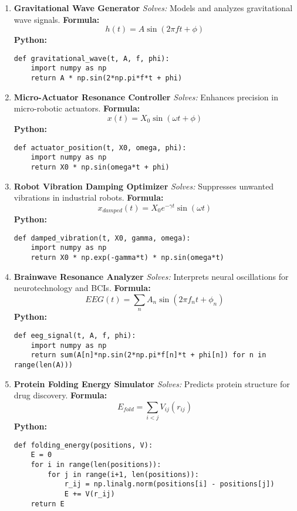 \documentclass[12pt]{article}
\begin{document}
\begin{enumerate}[leftmargin=0pt, label=\textbf{\arabic*.}, itemsep=3em]
\item \textbf{Gravitational Wave Generator}  
\textit{Solves:} Models and analyzes gravitational wave signals.  
\textbf{Formula:}  
\[
h(t) = A \sin(2\pi f t + \phi)
\]  
\textbf{Python:}
\begin{lstlisting}
def gravitational_wave(t, A, f, phi):
    import numpy as np
    return A * np.sin(2*np.pi*f*t + phi)
\end{lstlisting}

\item \textbf{Micro-Actuator Resonance Controller}  
\textit{Solves:} Enhances precision in micro-robotic actuators.  
\textbf{Formula:}  
\[
x(t) = X_0 \sin(\omega t + \phi)
\]  
\textbf{Python:}
\begin{lstlisting}
def actuator_position(t, X0, omega, phi):
    import numpy as np
    return X0 * np.sin(omega*t + phi)
\end{lstlisting}

\item \textbf{Robot Vibration Damping Optimizer}  
\textit{Solves:} Suppresses unwanted vibrations in industrial robots.  
\textbf{Formula:}  
\[
x_{damped}(t) = X_0 e^{-\gamma t} \sin(\omega t)
\]  
\textbf{Python:}
\begin{lstlisting}
def damped_vibration(t, X0, gamma, omega):
    import numpy as np
    return X0 * np.exp(-gamma*t) * np.sin(omega*t)
\end{lstlisting}

\item \textbf{Brainwave Resonance Analyzer}  
\textit{Solves:} Interprets neural oscillations for neurotechnology and BCIs.  
\textbf{Formula:}  
\[
EEG(t) = \sum_{n} A_n \sin(2\pi f_n t + \phi_n)
\]  
\textbf{Python:}
\begin{lstlisting}
def eeg_signal(t, A, f, phi):
    import numpy as np
    return sum(A[n]*np.sin(2*np.pi*f[n]*t + phi[n]) for n in range(len(A)))
\end{lstlisting}

\item \textbf{Protein Folding Energy Simulator}  
\textit{Solves:} Predicts protein structure for drug discovery.  
\textbf{Formula:}  
\[
E_{fold} = \sum_{i<j} V_{ij}(r_{ij})
\]  
\textbf{Python:}
\begin{lstlisting}
def folding_energy(positions, V):
    E = 0
    for i in range(len(positions)):
        for j in range(i+1, len(positions)):
            r_ij = np.linalg.norm(positions[i] - positions[j])
            E += V(r_ij)
    return E
\end{lstlisting}

\end{enumerate}
\end{document}
